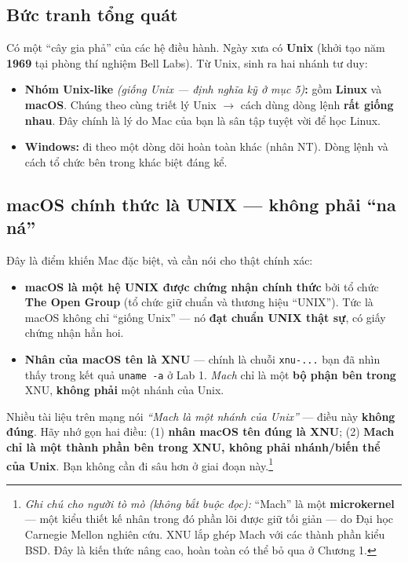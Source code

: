 \documentclass[12pt,a4paper]{article}
\begin{document}
\subsection{Bức tranh tổng quát}

Có một ``cây gia phả'' của các hệ điều hành. Ngày xưa có \textbf{Unix} (khởi tạo năm \textbf{1969} tại phòng thí nghiệm Bell Labs). Từ Unix, sinh ra hai nhánh tư duy:

\begin{itemize}[leftmargin=*]
  \item \textbf{Nhóm Unix-like} \textit{(giống Unix — định nghĩa kỹ ở mục 5)}\textbf{:} gồm \textbf{Linux} và \textbf{macOS}. Chúng theo cùng triết lý Unix $\rightarrow$ cách dùng dòng lệnh \textbf{rất giống nhau}. Đây chính là lý do Mac của bạn là sân tập tuyệt vời để học Linux.
  \item \textbf{Windows:} đi theo một dòng dõi hoàn toàn khác (nhân NT). Dòng lệnh và cách tổ chức bên trong khác biệt đáng kể.
\end{itemize}

\subsection{macOS chính thức là UNIX — không phải ``na ná''}

Đây là điểm khiến Mac đặc biệt, và cần nói cho thật chính xác:

\begin{itemize}[leftmargin=*]
  \item \textbf{macOS là một hệ UNIX được chứng nhận chính thức} bởi tổ chức \textbf{The Open Group} (tổ chức giữ chuẩn và thương hiệu ``UNIX''). Tức là macOS không chỉ ``giống Unix'' — nó \textbf{đạt chuẩn UNIX thật sự}, có giấy chứng nhận hẳn hoi.
  \item \textbf{Nhân của macOS tên là XNU} — chính là chuỗi \texttt{xnu-...} bạn đã nhìn thấy trong kết quả \texttt{uname -a} ở Lab 1. \textit{Mach} chỉ là một \textbf{bộ phận bên trong} XNU, \textbf{không phải} một nhánh của Unix.
\end{itemize}

\begin{warnbox}
Nhiều tài liệu trên mạng nói \textit{``Mach là một nhánh của Unix''} — điều này \textbf{không đúng}. Hãy nhớ gọn hai điều: (1) \textbf{nhân macOS tên đúng là XNU}; (2) \textbf{Mach chỉ là một thành phần bên trong XNU, không phải nhánh/biến thể của Unix}. Bạn không cần đi sâu hơn ở giai đoạn này.\footnote{\textit{Ghi chú cho người tò mò (không bắt buộc đọc):} ``Mach'' là một \textbf{microkernel} — một kiểu thiết kế nhân trong đó phần lõi được giữ tối giản — do Đại học Carnegie Mellon nghiên cứu. XNU lắp ghép Mach với các thành phần kiểu BSD. Đây là kiến thức nâng cao, hoàn toàn có thể bỏ qua ở Chương 1.}
\end{warnbox}
\end{document}
